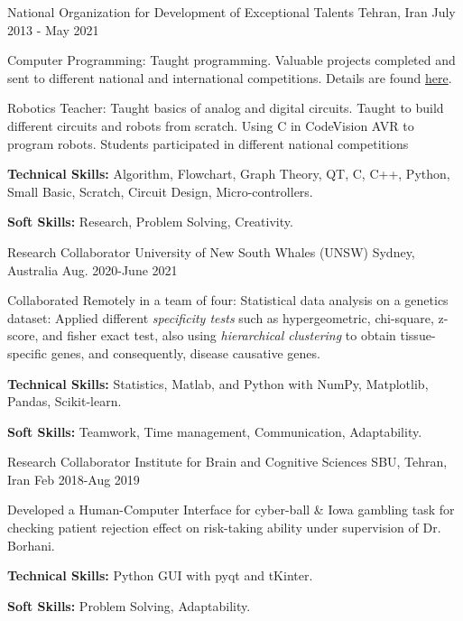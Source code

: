 \begin{cventries}
    {National Organization for Development of Exceptional Talents}
    {Tehran, Iran}
    {July 2013 -  May 2021}
    {
      \begin{cvitems} %
        \item{Computer Programming:}
          {Taught programming. Valuable projects completed and sent to different national and international competitions. Details are found \href{https://sites.google.com/view/steacher/farzanegan-1-high-school/junior-programming}{here}.}
        \item{Robotics Teacher:}
          {Taught basics of analog and digital circuits. Taught to build different circuits and robots from scratch. Using C in CodeVision AVR to program robots. Students participated in different national competitions}
        \item {\textbf{Technical Skills:} Algorithm, Flowchart, Graph Theory, QT, C, C++, Python, Small Basic, Scratch, Circuit Design, Micro-controllers.}
        \item {\textbf{Soft Skills:} Research, Problem Solving, Creativity.}
      \end{cvitems}
    }
    
  \cventry
{Research Collaborator}  %
    {University of New South Whales (UNSW)} %
    {Sydney, Australia} %
    {Aug. 2020-June 2021} %
    {
      \begin{cvitems} %
        \item{Collaborated Remotely in a team of four: Statistical data analysis on a genetics dataset: Applied different \textit{specificity tests} such as hypergeometric, chi-square, z-score, and fisher exact test, also using \textit{hierarchical clustering} to obtain tissue-specific genes, and consequently, disease causative genes.}
        \item {\textbf{Technical Skills:} Statistics, Matlab, and Python with NumPy, Matplotlib, Pandas, Scikit-learn.}
        \item {\textbf{Soft Skills:} Teamwork, Time management, Communication, Adaptability.}
      \end{cvitems}
    }
 
  \cventry
    {Research Collaborator}  %
    {Institute for Brain and Cognitive Sciences} %
    {SBU, Tehran, Iran} %
    {Feb 2018-Aug 2019} %
    {
      \begin{cvitems} %
        \item{Developed a Human-Computer Interface for cyber-ball \& Iowa gambling task for checking patient rejection effect on risk-taking ability under supervision of Dr. Borhani.}
        \item {\textbf{Technical Skills:} Python GUI with pyqt and tKinter.}
        \item {\textbf{Soft Skills:} Problem Solving, Adaptability.}
      \end{cvitems}
    }


\end{cventries}
